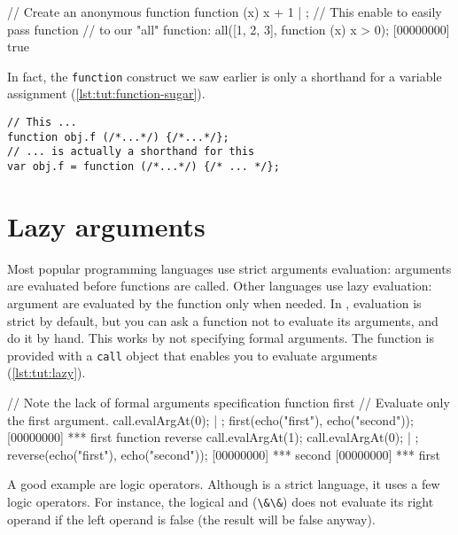 \begin{urbiscript}[caption=Lambda function, label=lst:tut:lambda, name=all]
// Create an anonymous function
function (x) {x + 1} | {};
// This enable to easily pass function
// to our "all" function:
all([1, 2, 3], function (x) { x > 0});
[00000000] true
\end{urbiscript}

In fact, the \lstinline{function} construct we saw earlier is only a
shorthand for a variable assignment (\autoref{lst:tut:function-sugar}).

\begin{lstlisting}[caption=The function sugar,
  label=lst:tut:function-sugar]
// This ...
function obj.f (/*...*/) {/*...*/};
// ... is actually a shorthand for this
var obj.f = function (/*...*/) {/* ... */};
\end{lstlisting}

\section{Lazy arguments}

Most popular programming languages use strict arguments evaluation:
arguments are evaluated before functions are called. Other languages
use lazy evaluation: argument are evaluated by the function only when
needed. In \us, evaluation is strict by default, but you can ask a
function not to evaluate its arguments, and do it by hand. This works
by not specifying formal arguments. The function is provided with a
\lstinline{call} object that enables you to evaluate arguments
(\autoref{lst:tut:lazy}).

\begin{urbiscript}[caption=Tweaking arguments evaluation,
  label=lst:tut:lazy]
// Note the lack of formal arguments specification
function first
{
  // Evaluate only the first argument.
  call.evalArgAt(0);
} | {};
first(echo("first"), echo("second"));
[00000000] *** first
function reverse
{
  call.evalArgAt(1);
  call.evalArgAt(0);
} | {};
reverse(echo("first"), echo("second"));
[00000000] *** second
[00000000] *** first
\end{urbiscript}

A good example are logic operators. Although \Cxx is a strict
language, it uses a few logic operators. For instance, the logical and
(\lstinline{\&\&}) does not evaluate its right operand if the left
operand is false (the result will be false anyway).

